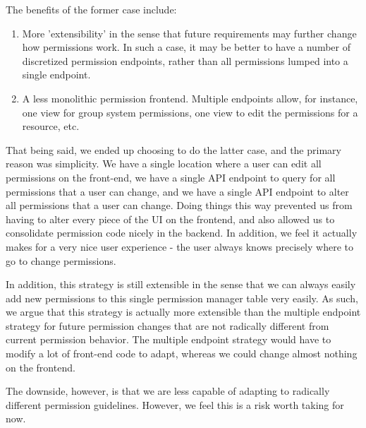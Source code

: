 \documentclass[12pt]{article}
\begin{document}
The benefits of the former case include:
\begin{enumerate}
    \item More 'extensibility' in the sense that future requirements may further change how permissions work. In such a case, it may be better to have a number of discretized permission endpoints, rather than all permissions lumped into a single endpoint. 
    \item A less monolithic permission frontend. Multiple endpoints allow, for instance, one view for group system permissions, one view to edit the permissions for a resource, etc. 
\end{enumerate}

That being said, we ended up choosing to do the latter case, and the primary reason was simplicity. We have a single location where a user can edit all permissions on the front-end, we have a single API endpoint to query for all permissions that a user can change, and we have a single API endpoint to alter all permissions that a user can change. Doing things this way prevented us from having to alter every piece of the UI on the frontend, and also allowed us to consolidate permission code nicely in the backend. In addition, we feel it actually makes for a very nice user experience - the user always knows precisely where to go to change permissions. 

In addition, this strategy is still extensible in the sense that we can always easily add new permissions to this single permission manager table very easily. As such, we argue that this strategy is actually more extensible than the multiple endpoint strategy for future permission changes that are not radically different from current permission behavior. The multiple endpoint strategy would have to modify a lot of front-end code to adapt, whereas we could change almost nothing on the frontend. 

The downside, however, is that we are less capable of adapting to radically different permission guidelines. However, we feel this is a risk worth taking for now. 
\end{document}
